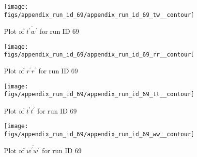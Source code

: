 \begin{figure}[H]
\centering
\texttt{[image: figs/appendix\_run\_id\_69/appendix\_run\_id\_69\_tw\_\_contour]}
\caption{Plot of $\overline{t^\prime w^\prime}$ for run ID 69}
\label{fig:appendix_run_id_69_tw__contour}
\end{figure}


\begin{figure}[H]
\centering
\texttt{[image: figs/appendix\_run\_id\_69/appendix\_run\_id\_69\_rr\_\_contour]}
\caption{Plot of $\overline{r^\prime r^\prime}$ for run ID 69}
\label{fig:appendix_run_id_69_rr__contour}
\end{figure}


\begin{figure}[H]
\centering
\texttt{[image: figs/appendix\_run\_id\_69/appendix\_run\_id\_69\_tt\_\_contour]}
\caption{Plot of $\overline{t^\prime t^\prime}$ for run ID 69}
\label{fig:appendix_run_id_69_tt__contour}
\end{figure}


\begin{figure}[H]
\centering
\texttt{[image: figs/appendix\_run\_id\_69/appendix\_run\_id\_69\_ww\_\_contour]}
\caption{Plot of $\overline{w^\prime w^\prime}$ for run ID 69}
\label{fig:appendix_run_id_69_ww__contour}
\end{figure}


